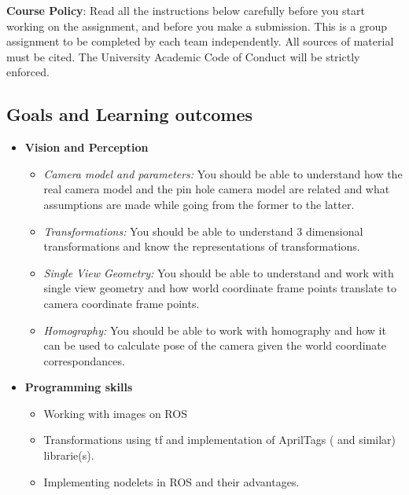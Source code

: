 \documentclass[letta4 paper]{article}
\begin{document}
\noindent\textbf{Course Policy}: Read all the instructions below carefully before you start working on the assignment, and before you make a submission. This is a group assignment to be completed by each team independently. All sources of material must be cited. The University Academic Code of Conduct will be strictly enforced.
\subsection{Goals and Learning outcomes}
\begin{itemize}
    \item \textbf{Vision and Perception}
    \begin{itemize}
        \item \textit{Camera model and parameters:}
        You should be able to understand how the real camera model and the pin hole camera model are related and what assumptions are made while going from the former to the latter.
        \item \textit{Transformations:}
        You should be able to understand 3 dimensional transformations and know the representations of transformations. 
        \item \textit{Single View Geometry:}
        You should be able to understand and work with single view geometry and how world coordinate frame points translate to camera coordinate frame points. 
        \item \textit{Homography:}
        You should be able to work with homography and how it can be used to calculate pose of the camera given the world coordinate correspondances. 
    \end{itemize}{}
    
    \item \textbf{Programming skills }
    \begin{itemize}
        \item Working with images on ROS
        \item Transformations using tf and implementation of AprilTags ( and similar) librarie(s). \item Implementing nodelets in ROS and their advantages. 
    \end{itemize}{}
    
\end{itemize}
\end{document}
